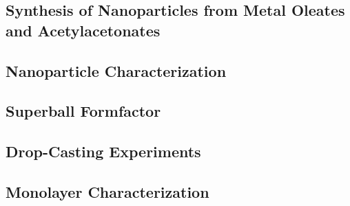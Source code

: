 \documentclass[\main/dresen_thesis.tex]{subfiles}
\renewcommand{\thisPath}{\main/chapters/monolayers/experimentalMethods/}
\begin{document}
  \subsection{Synthesis of  Nanoparticles from Metal Oleates and Acetylacetonates}
    
      \FloatBarrier

  \subsection{Nanoparticle Characterization}
    
      \FloatBarrier

  \subsection{Superball Formfactor}
    
      \FloatBarrier

  \subsection{Drop-Casting Experiments}
    
    \FloatBarrier

  \subsection{Monolayer Characterization}
    
    \FloatBarrier
\end{document}

